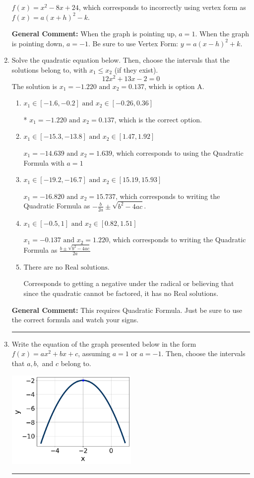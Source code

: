 \documentclass{extbook}[14pt]
\newcommand{\litem}[1]{\item #1

\rule{\textwidth}{0.4pt}}
\begin{document}
\begin{enumerate}
{\begin{enumerate}[label=\Alph*.]
$f(x)=x^{2} -8 x + 24$, which corresponds to incorrectly using vertex form as $f(x) = a(x+h)^2 - k$.
\end{enumerate}

\textbf{General Comment:} When the graph is pointing up, $a=1$. When the graph is pointing down, $a=-1$. Be sure to use Vertex Form: $y = a(x-h)^2+k$.
}
\litem{
Solve the quadratic equation below. Then, choose the intervals that the solutions belong to, with $x_1 \leq x_2$ (if they exist).
\[ 12x^{2} +13 x -2 = 0 \]The solution is \( x_1 = -1.220 \text{ and } x_2 = 0.137 \), which is option A.\begin{enumerate}[label=\Alph*.]
\item \( x_1 \in [-1.6, -0.2] \text{ and } x_2 \in [-0.26, 0.36] \)

* $x_1 = -1.220 \text{ and } x_2 = 0.137$, which is the correct option.
\item \( x_1 \in [-15.3, -13.8] \text{ and } x_2 \in [1.47, 1.92] \)

 $x_1 = -14.639 \text{ and } x_2 = 1.639$, which corresponds to using the Quadratic Formula with $a=1$
\item \( x_1 \in [-19.2, -16.7] \text{ and } x_2 \in [15.19, 15.93] \)

 $x_1 = -16.820 \text{ and } x_2 = 15.737$, which corresponds to writing the Quadratic Formula as $-\frac{b}{2a} \pm \sqrt{b^2 - 4ac}$.
\item \( x_1 \in [-0.5, 1] \text{ and } x_2 \in [0.82, 1.51] \)

 $x_1 = -0.137 \text{ and } x_2 = 1.220$, which corresponds to writing the Quadratic Formula as $\frac{b \pm \sqrt{b^2 - 4ac}}{2a}$
\item \( \text{There are no Real solutions.} \)

Corresponds to getting a negative under the radical or believing that since the quadratic cannot be factored, it has no Real solutions.
\end{enumerate}

\textbf{General Comment:} This requires Quadratic Formula. Just be sure to use the correct formula and watch your signs.
}
\litem{
Write the equation of the graph presented below in the form $f(x)=ax^2+bx+c$, assuming  $a=1$ or $a=-1$. Then, choose the intervals that $a, b,$ and $c$ belong to.

\begin{center}
    \includegraphics[width=0.5\textwidth]{../Figures/quadraticGraphToEquationA.png}
\end{center}


}
\end{enumerate}
\end{document}
